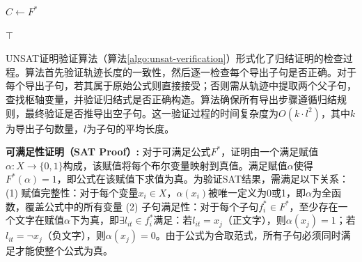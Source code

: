     \begin{algorithm}[H]
        \SetAlgoLined
        \label{algo:unsat-verification}
        
        
        $C \leftarrow F^*$\;
        
        
        \KwRet $\top$\;
    \end{algorithm}
    
    UNSAT证明验证算法（算法\ref{algo:unsat-verification}）形式化了归结证明的检查过程。算法首先验证轨迹长度的一致性，然后逐一检查每个导出子句是否正确。对于每个导出子句，若其属于原始公式则直接接受；否则需从轨迹中提取两个父子句，查找枢轴变量，并验证归结式是否正确构造。算法确保所有导出步骤遵循归结规则，最终验证是否推导出空子句。这一验证过程的时间复杂度为$O(k \cdot l^2)$，其中$k$为导出子句数量，$l$为子句的平均长度。
    
    \textbf{可满足性证明（SAT Proof）:}
    对于可满足公式$F^*$，证明由一个满足赋值$\alpha: X \rightarrow \{0, 1\}$构成，该赋值将每个布尔变量映射到真值。满足赋值$\alpha$使得$F^*(\alpha) = 1$，即公式在该赋值下求值为真。为验证SAT结果，需满足以下关系：(1) 赋值完整性：对于每个变量$x_i \in X$，$\alpha(x_i)$被唯一定义为0或1，即$\alpha$为全函数，覆盖公式中的所有变量 (2) 子句满足性：对于每个子句$f^*_i \in F^*$，至少存在一个文字在赋值$\alpha$下为真，即$\exists l_{it} \in f^*_i$满足：若$l_{it} = x_j$（正文字），则$\alpha(x_j) = 1$；若$l_{it} = \neg x_j$（负文字），则$\alpha(x_j) = 0$。由于公式为合取范式，所有子句必须同时满足才能使整个公式为真。
    
